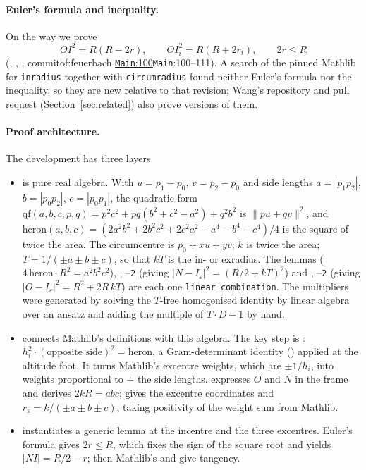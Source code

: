 \documentclass[11pt]{article}
\theoremstyle{definition}
\theoremstyle{remark}
\newcommand{\lean}[1]{\texttt{#1}}
\newcommand{\commitof}[1]{\csname commitof:#1\endcsname}
\newcommand{\repo}[1]{https://github.com/jpbald93/#1}
\newcommand{\src}[4]{\ifcsname commitof:#1\endcsname
  \href{\repo{#1}/blob/\commitof{#1}/#2/#3.lean\#L#4}{\texttt{#3}:#4}\else\texttt{#3}:#4\fi}
\begin{document}
\paragraph{Euler's formula and inequality.} On the way we prove
\[
 OI^2=R(R-2r),\qquad OI_i^2=R(R+2r_i),\qquad 2r\le R
\]
(, ,
, \src{feuerbach}{Feuerbach}{Main}{100}--111).
A search of the pinned Mathlib for \lean{inradius} together with \lean{circumradius} found neither
Euler's formula nor the inequality, so they are new relative to that revision; Wang's repository
and pull request (Section~\ref{sec:related}) also prove versions of them.

\paragraph{Proof architecture.} The development has three layers.
\begin{itemize}
\item {} is pure real algebra. With $u=p_1-p_0$, $v=p_2-p_0$ and side
lengths $a=|p_1p_2|$, $b=|p_0p_2|$, $c=|p_0p_1|$, the quadratic form
$\mathrm{qf}(a,b,c,p,q)=p^2c^2+pq(b^2+c^2-a^2)+q^2b^2$ is $\|pu+qv\|^2$, and
$\mathrm{heron}(a,b,c)=(2a^2b^2+2b^2c^2+2c^2a^2-a^4-b^4-c^4)/4$ is the square of twice the area.
The circumcentre is $p_0+xu+yv$; $k$ is twice the area; $T=1/(\pm a\pm b\pm c)$, so that $kT$ is
the in- or exradius. The lemmas  ($4\,\mathrm{heron}\cdot
R^2=a^2b^2c^2$), , --\lean{2} (giving
$|N-I_\varepsilon|^2=(R/2\mp kT)^2$) and , --\lean{2}
(giving $|O-I_\varepsilon|^2=R^2\mp2R\,kT$) are each one \lean{linear\_combination}. The
multipliers were generated by solving the $T$-free homogenised identity by linear algebra over an
ansatz and adding the multiple of $T\cdot D-1$ by hand.
\item {} connects Mathlib's definitions with this algebra. The key
step is : $h_i^2\cdot(\text{opposite side})^2=\mathrm{heron}$, a
Gram-determinant identity () applied at the altitude foot. It turns
Mathlib's excentre weights, which are $\pm1/h_i$, into weights proportional to $\pm$ the side
lengths.  expresses $O$ and $N$ in the frame and derives $2kR=abc$;
 gives the excentre coordinates and $r_\varepsilon=k/(\pm a\pm b\pm c)$,
taking positivity of the weight sum from Mathlib.
\item {} instantiates a generic lemma  at the incentre
and the three excentres. Euler's formula gives $2r\le R$, which fixes the sign of the square root
and yields $|NI|=R/2-r$; then Mathlib's 
and  give tangency.
\end{itemize}
\end{document}
